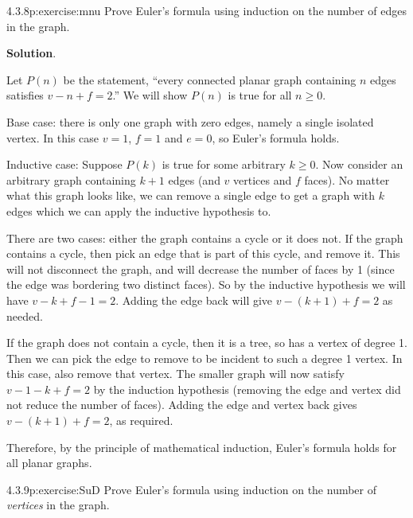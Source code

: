 \documentclass[twoside,11pt,]{book}
\newcommand{\blocktitlefont}{\relax}
\numberwithin{equation}{chapter}
\begin{document}
\begin{divisionsolution}{4.3.8}{}{p:exercise:mnu}%
Prove Euler's formula using induction on the number of edges in the graph.%
\par\smallskip%
\noindent\textbf{\blocktitlefont Solution}.\quad{}\begin{solutionproof}
Let \(P(n)\) be the statement, ``every connected planar graph containing \(n\) edges satisfies \(v - n + f = 2\).'' We will show \(P(n)\) is true for all \(n \ge 0\).%
\par
Base case: there is only one graph with zero edges, namely a single isolated vertex. In this case \(v = 1\), \(f = 1\) and \(e = 0\), so Euler's formula holds.%
\par
Inductive case: Suppose \(P(k)\) is true for some arbitrary \(k \ge 0\). Now consider an arbitrary graph containing \(k+1\) edges (and \(v\) vertices and \(f\) faces). No matter what this graph looks like, we can remove a single edge to get a graph with \(k\) edges which we can apply the inductive hypothesis to.%
\par
There are two cases: either the graph contains a cycle or it does not. If the graph contains a cycle, then pick an edge that is part of this cycle, and remove it.  This will not disconnect the graph, and will decrease the number of faces by 1 (since the edge was bordering two distinct faces).  So by the inductive hypothesis we will have \(v - k + f-1 = 2\). Adding the edge back will give \(v - (k+1) + f = 2\) as needed.%
\par
If the graph does not contain a cycle, then it is a tree, so has a vertex of degree 1.  Then we can pick the edge to remove to be incident to such a degree 1 vertex. In this case, also remove that vertex. The smaller graph will now satisfy \(v-1 - k + f = 2\) by the induction hypothesis (removing the edge and vertex did not reduce the number of faces). Adding the edge and vertex back gives \(v - (k+1) + f = 2\), as required.%
\par
Therefore, by the principle of mathematical induction, Euler's formula holds for all planar graphs.%
\end{solutionproof}
\end{divisionsolution}%
\begin{divisionsolution}{4.3.9}{}{p:exercise:SuD}%
Prove Euler's formula using induction on the number of \emph{vertices} in the graph.%
\end{divisionsolution}%
\end{document}
